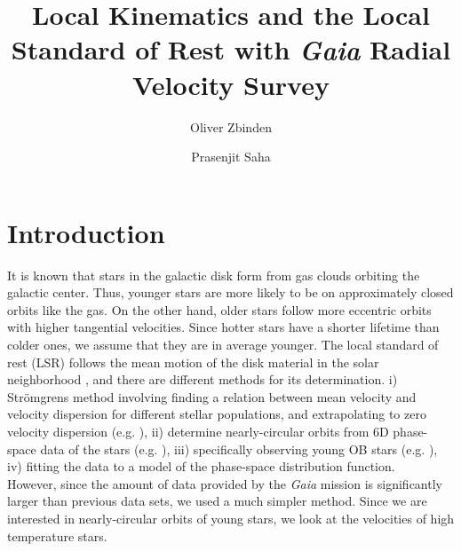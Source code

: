 \documentclass{aastex62}
\begin{document}
	
	\title{Local Kinematics and the Local Standard of Rest with \textit{Gaia} Radial Velocity Survey}
	
	
	\author{Oliver Zbinden}
	
	
	\author{Prasenjit Saha}

	
	\section{Introduction}\label{intro}
	
	It is known that stars in the galactic disk form from gas clouds orbiting the galactic center. Thus, younger stars are more likely to be on approximately closed orbits like the gas. On the other hand, older stars follow more eccentric orbits with higher tangential velocities. Since hotter stars have a shorter lifetime than colder ones, we assume that they are in average younger. The local standard of rest (LSR) follows the mean motion of the disk material in the solar neighborhood \citep{shu}, and there are different methods for its determination. i) Str\"omgrens method involving finding a relation between mean velocity and velocity dispersion for different stellar
	populations, and extrapolating to zero velocity dispersion (e.g. \cite{ding}), ii) determine nearly-circular orbits from 6D phase-space data of the stars (e.g. \cite{francis}), iii) specifically observing young OB stars (e.g. \cite{boby}), iv) fitting the data to a model of the phase-space distribution function.
	\\
	However, since the amount of data provided by the \textit{Gaia} mission \citep{gaiamission} is significantly larger than previous data sets, we used a much simpler method. Since we are interested in nearly-circular orbits of young stars, we look at the velocities of high temperature stars.
	
\end{document}
